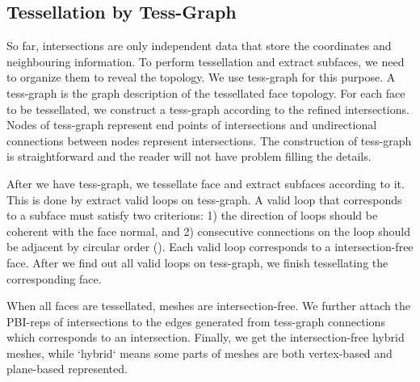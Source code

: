 \documentclass[10pt,journal,compsoc]{IEEEtran}
\begin{document}
\subsection{Tessellation by Tess-Graph}
\label{sec:tess}
So far, intersections are only independent data that store the coordinates and neighbouring information. To perform tessellation and extract subfaces, we need to organize them to reveal the topology. We use tess-graph for this purpose. A tess-graph is the graph description of the tessellated face topology. For each face to be tessellated, we construct a tess-graph according to the refined intersections. Nodes of tess-graph represent end points of intersections and undirectional connections between nodes represent intersections. The construction of tess-graph is straightforward and the reader will not have problem filling the details.

After we have tess-graph, we tessellate face and extract subfaces according to it. This is done by extract valid loops on tess-graph. A valid loop that corresponds to a subface must satisfy two criterions: 1) the direction of loops should be coherent with the face normal, and 2) consecutive connections on the loop should be adjacent by circular order ({\color{red}{Fig.?}}). Each valid loop corresponds to a intersection-free face. After we find out all valid loops on tess-graph, we finish tessellating the corresponding face.

When all faces are tessellated, meshes are intersection-free. We further attach the PBI-reps of intersections to the edges generated from tess-graph connections which corresponds to an intersection. Finally, we get the intersection-free hybrid meshes, while `hybrid` means some parts of meshes are both vertex-based and plane-based represented.


\end{document}
